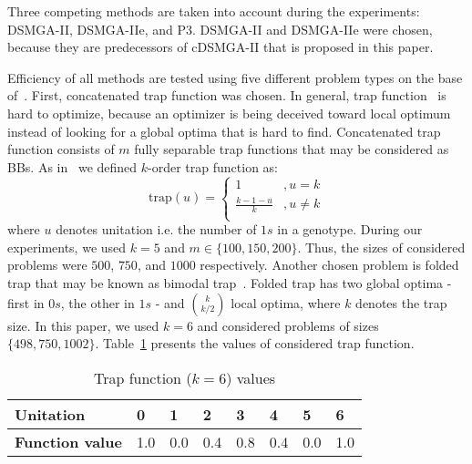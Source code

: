 Three competing methods are taken into account during the experiments: DSMGA-II, DSMGA-IIe, and P3. DSMGA-II and DSMGA-IIe were chosen, because they are predecessors of cDSMGA-II that is proposed in this paper. 

Efficiency of all methods are tested using five different problem types on the base of~\cite{dsmga2,dsmga2e,p3}. First, concatenated trap function was chosen. In general, trap function~\cite{decFunc} is hard to optimize, because an optimizer is being deceived toward local optimum instead of looking for a global optima that is hard to find. Concatenated trap function consists of $m$ fully separable trap functions that may be considered as BBs. As in~\cite{dsmga2,dsmga2e} we defined $k$-order trap function as:
\begin{equation}
	\text{trap}(u) =
	\begin{cases}
		1 & , u = k \\
		\frac{k - 1- u}{k} & , u \neq k \\
	\end{cases}
\end{equation}
where $u$ denotes unitation i.e. the number of $1s$ in a genotype. During our experiments, we used $k = 5$ and $m \in \{100, 150, 200\}$. Thus, the sizes of considered problems were $500$, $750$, and $1000$ respectively. Another chosen problem is folded trap that may be known as bimodal trap~\cite{deceptive}. Folded trap has two global optima - first in $0s$, the other in $1s$ - and ${k}\choose{k/2}$ local optima, where $k$ denotes the trap size. In this paper, we used $k = 6$ and considered problems of sizes $\{498, 750, 1002\}$. Table~\ref{tab:trapFunction} presents the values of considered trap function.

\begin{table}
	\caption{Trap function ($k = 6$) values}
	\label{tab:trapFunction}
	\begin{tabular}{llllllll}
		\toprule
		\textbf{Unitation} & \textbf{0} & \textbf{1} & \textbf{2} & \textbf{3} & \textbf{4} & \textbf{5} & \textbf{6} \\
		\midrule
		\textbf{Function value} & 1.0 & 0.0 & 0.4 & 0.8 & 0.4 & 0.0 & 1.0 \\
		\bottomrule
	\end{tabular}
\end{table}

